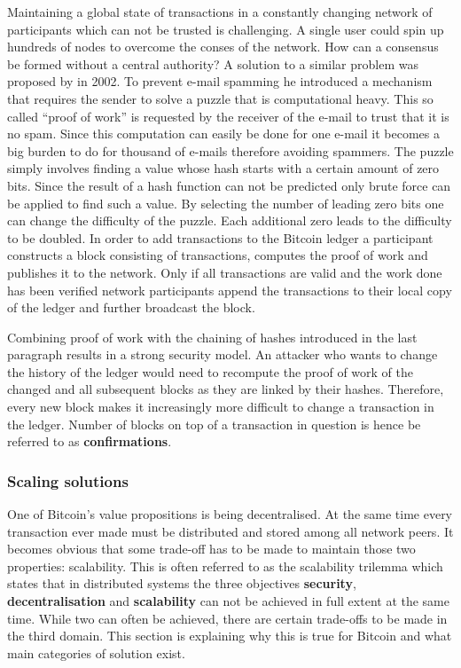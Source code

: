 \documentclass[final]{fhnwreport}       %
\begin{document}
Maintaining a global state of transactions in a constantly changing network of participants which can not be trusted is challenging. A single user could spin up hundreds of nodes to overcome the conses of the network. How can a consensus be formed without a central authority? A solution to a similar problem was proposed by \textcite{back_hashcash_2002} in 2002. To prevent e-mail spamming he introduced a mechanism that requires the sender to solve a puzzle that is computational heavy. This so called ``proof of work'' is requested by the receiver of the e-mail to trust that it is no spam. Since this computation can easily be done for one e-mail it becomes a big burden to do for thousand of e-mails therefore avoiding spammers. The puzzle simply involves finding a value whose hash starts with a certain amount of zero bits. Since the result of a hash function can not be predicted only brute force can be applied to find such a value. By selecting the number of leading zero bits one can change the difficulty of the puzzle. Each additional zero leads to the difficulty to be doubled. In order to add transactions to the Bitcoin ledger a participant constructs a block consisting of transactions, computes the proof of work and publishes it to the network. Only if all transactions are valid and the work done has been verified network participants append the transactions to their local copy of the ledger and further broadcast the block.  

Combining proof of work with the chaining of hashes introduced in the last paragraph results in a strong security model. An attacker who wants to change the history of the ledger would need to recompute the proof of work of the changed and all subsequent blocks as they are linked by their hashes. Therefore, every new block makes it increasingly more difficult to change a transaction in the ledger. Number of blocks on top of a transaction in question is hence be referred to as \textbf{confirmations}.  

\subsubsection{Scaling solutions}
One of Bitcoin's value propositions is being decentralised. At the same time every transaction ever made must be distributed and stored among all network peers. It becomes obvious that some trade-off has to be made to maintain those two properties: scalability. This is often referred to as the scalability trilemma  which states that in distributed systems the three objectives \textbf{security}, \textbf{decentralisation} and \textbf{scalability} can not be achieved in full extent at the same time. While two can often be achieved, there are certain trade-offs to be made in the third domain. This section is explaining why this is true for Bitcoin and what main categories of solution exist.
\end{document}
